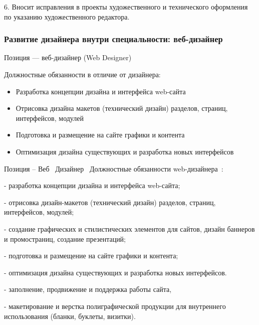 \documentclass{../industrial-development}
\begin{document}
6.	Вносит исправления в проекты художественного и технического оформления по указанию художественного редактора.

\begin{frame} \frametitle{Развитие дизайнера внутри специальности: веб-дизайнер }
 \begin{block}{}
  \alert{Позиция --- веб-дизайнер (Web Designer)}

Должностные обязанности в отличие от дизайнера: 
  \end{block}
  \begin{itemize}
  \item   Разработка концепции дизайна и интерфейса web-сайта
  \item  Отрисовка дизайна макетов (технический дизайн) разделов, страниц, интерфейсов, модулей
  \item Подготовка и размещение на сайте графики и контента
 \item Оптимизация дизайна существующих и разработка новых интерфейсов
  \end{itemize}
\end{frame}

\lecturenotes

Позиция – Веб~\cite{hh} Дизайнер~\cite{itcf}
Должностные обязанности web-дизайнера~\cite{rab}:

- разработка концепции дизайна и интерфейса web-сайта;

- отрисовка дизайн-макетов (технический дизайн) разделов, страниц, интерфейсов, модулей;

- создание графических и стилистических элементов для сайтов, дизайн баннеров и промостраниц, создание презентаций;

- подготовка и размещение на сайте графики и контента;

- оптимизация дизайна существующих и разработка новых интерфейсов.

- заполнение, продвижение и поддержка работы сайта,

- макетирование и верстка полиграфической продукции для внутреннего использования (бланки, буклеты, визитки).

\end{document}
